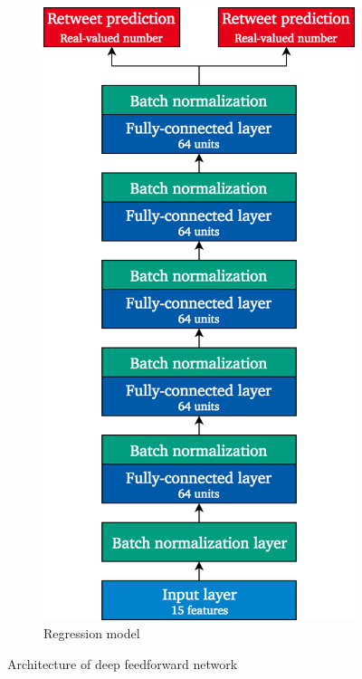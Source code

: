 \begin{figure}[h]
\begin{subfigure}{.4\textwidth}
  \includegraphics[width=.95\linewidth]{img/deep_1_regr_architecture}
  \caption{Regression model}
  \label{fig:deep1_architecture_2}
\end{subfigure}
\caption{Architecture of deep feedforward network}
\label{fig:deep1_architecture}
\end{figure}

